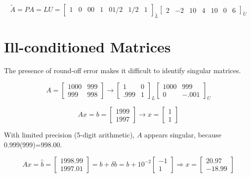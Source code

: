 \documentclass[12pt]{article}
\newcommand{\<}{\langle}
\renewcommand{\>}{\rangle}
\begin{document}
\[
	\tilde{A} = PA = LU = 
	\begin{bmatrix}
		1 & 0 & 0
		0 & 1 & 0
		1/2 & 1/2 & 1
	\end{bmatrix}_{\tilde{L}}
	\begin{bmatrix}
		2 & -2 & 1
		0 & 4 & 1
		0 & 0 & 6
	\end{bmatrix}_{\tilde{U}}
\]


\section{Ill-conditioned Matrices}

The presence of round-off error makes it difficult to identify singular matrices.

\[
	A =
	\begin{bmatrix}
		1000 & 999 \\ 999 & 998		
	\end{bmatrix}	
	\rightarrow
	\begin{bmatrix}
		1 & 0 \\ .999 & 1
	\end{bmatrix}_L
	\begin{bmatrix}
		1000 & 999 \\
		0 & -.001
	\end{bmatrix}_U
\]


\[
	Ax = b = \begin{bmatrix} 1999 \\ 1997 \end{bmatrix}
	\rightarrow
	x = \begin{bmatrix} 1 \\ 1 \end{bmatrix}
\]

With limited precision (5-digit arithmetic), $A$ appears singular, because 0.999(999)=998.00.

\[
	Ax = \hat{b} = \begin{bmatrix} 1998.99 \\ 1997.01 \end{bmatrix} =
	b + \delta b = b + 10^{-2} \begin{bmatrix} -1 \\ 1 \end{bmatrix}
	\Rightarrow
	x = \begin{bmatrix} 20.97 \\ -18.99 \end{bmatrix}
\]
\end{document}
